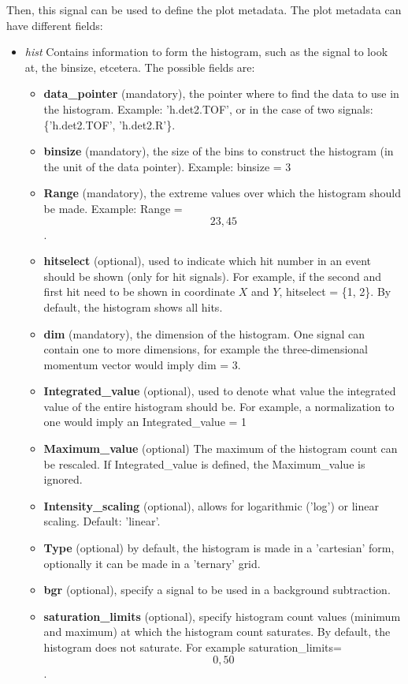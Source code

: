 Then, this signal can be used to define the plot metadata. The plot metadata can have different fields:
\begin{itemize}
\item \textit{hist} 	Contains information to form the histogram, such as the signal to look at, the binsize, etcetera. The possible fields are:
	\begin{itemize}
		\item \textbf{data\_pointer} 	(mandatory), the pointer where to find the data to use in the histogram. Example: 'h.det2.TOF', or in the case of two signals: \{'h.det2.TOF', 'h.det2.R'\}.
		\item \textbf{binsize} 		(mandatory), the size of the bins to construct the histogram (in the unit of the data pointer). Example: binsize = 3
		\item \textbf{Range} 		(mandatory), the extreme values over which the histogram should be made. Example: Range = \[23, 45\].		
		\item \textbf{hitselect} 	(optional), used to indicate which hit number in an event should be shown (only for hit signals). For example, if the second and first hit need to be shown in coordinate $X$ and $Y$, hitselect = \{1, 2\}. By default, the histogram shows all hits.
		\item \textbf{dim}	 	(mandatory), the dimension of the histogram. One signal can contain one to more dimensions, for example the three-dimensional momentum vector would imply dim = 3.
		\item \textbf{Integrated\_value} 	(optional), used to denote what value the integrated value of the entire histogram should be. For example, a normalization to one would imply an Integrated\_value = 1
		\item \textbf{Maximum\_value} 	(optional) The maximum of the histogram count can be rescaled. If Integrated\_value is defined, the Maximum\_value is ignored.
		\item \textbf{Intensity\_scaling} 	(optional), allows for logarithmic ('log') or linear scaling. Default: 'linear'.
		\item \textbf{Type} 		(optional) by default, the histogram is made in a 'cartesian' form, optionally it can be made in a 'ternary' grid.
		\item \textbf{bgr} 		(optional), specify a signal to be used in a background subtraction.
		\item \textbf{saturation\_limits}	(optional), specify histogram count values (minimum and maximum) at which the histogram count saturates. By default, the histogram does not saturate. For example saturation\_limits=\[0, 50 \].

\end{itemize}
\end{itemize}
